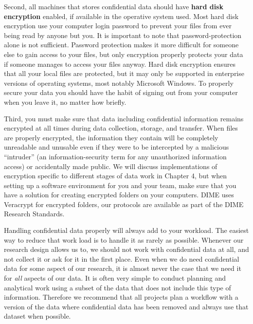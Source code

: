 Second, all machines that stores confidential data
should have \textbf{hard disk encryption} enabled,
if available in the operative system used.
Most hard disk encryption use your computer login password to
prevent your files from ever being read by anyone but you.
It is important to note that password-protection alone is not sufficient.
Password protection makes it more difficult for someone else to gain access to your files,
but only encryption properly protects your data if someone manages to access your files anyway.
Hard disk encryption ensures that all your local files are protected,
but it may only be supported in enterprise versions of operating systems,
most notably Microsoft Windows.
To properly secure your data you should have the habit of
signing out from your computer when you leave it,
no matter how briefly.

Third, you must make sure that data including confidential information
remains encrypted at all times during data collection, storage, and transfer.
When files are properly encrypted,
the information they contain will be completely unreadable and unusable
even if they were to be intercepted by a malicious ``intruder'' 
(an information-security term for any unauthorized information access) 
or accidentally made public.
We will discuss implementations of encryption
specific to different stages of data work in Chapter 4,
but when setting up a software environment for you and your team,
make sure that you have a solution for creating encrypted folders on your computers.
DIME uses Veracrypt for encrypted folders,
our protocols are available as part of the DIME Research Standards.

Handling confidential data properly will always add to your workload.
The easiest way to reduce that work load is to
handle it as rarely as possible.
Whenever our research design allows us to,
we should not work with confidential data at all,
and not collect it or ask for it in the first place.
Even when we do need confidential data for some aspect of our research,
it is almost never the case that we need it for \textit{all} aspects of our data.
It is often very simple to conduct planning and analytical work
using a subset of the data that does not include this type of information.
Therefore we recommend that all projects plan a workflow
with a version of the data where confidential data has been removed
and always use that dataset when possible.

